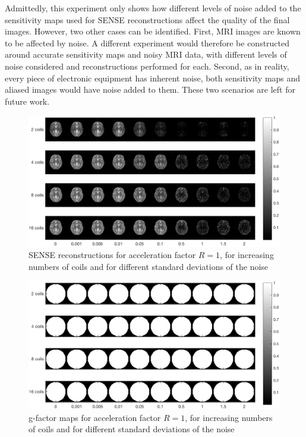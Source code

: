 Admittedly, this experiment only shows how different levels of noise added to the sensitivity maps used for SENSE reconstructions affect the quality of the final images. However, two other cases can be identified. First, MRI images are known to be affected by noise. A different experiment would therefore be constructed around accurate sensitivity maps and noisy MRI data, with different levels of noise considered and reconstructions performed for each. Second, as in reality, every piece of electronic equipment has inherent noise, both sensitivity maps and aliased images would have noise added to them. These two scenarios are left for future work.

\begin{figure}[H]
    \centering
    \includegraphics[width=1\textwidth,keepaspectratio]{R1recnoiseb}
    \caption{SENSE reconstructions for acceleration factor $R = 1$, for increasing numbers of coils and for different standard deviations of the noise}
    \label{fig:R1recsnoisej}
\end{figure}

\begin{figure}[H]
    \centering
    \includegraphics[width=1\textwidth,keepaspectratio]{R1gfactnoiseb}
    \caption{g-factor maps for acceleration factor $R = 1$, for increasing numbers of coils and for different standard deviations of the noise}
    \label{fig:R1gfactnoisej}
\end{figure}


